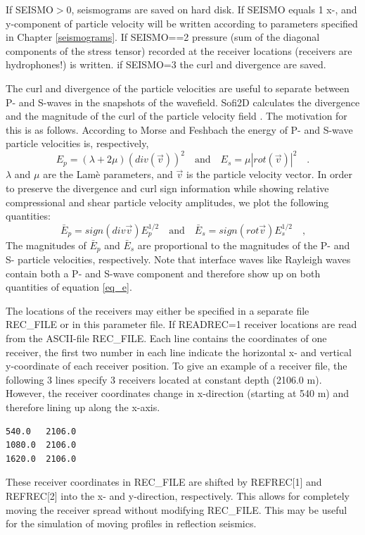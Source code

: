 \documentclass[11pt,onecolumn,oneside]{article}
\begin{document}
If SEISMO$>$0, seismograms are saved on hard disk. If SEISMO equals 1 x-, and y-component of particle velocity will be written according to parameters specified in Chapter \ref{seismograms}.
If SEISMO==2 pressure (sum of the diagonal components of the stress tensor) recorded at the receiver locations (receivers are hydrophones!) is written. if SEISMO=3 the curl and divergence are saved. 

The curl and divergence of the particle velocities are useful to separate between P- and S-waves in the snapshots of the wavefield. Sofi2D calculates the divergence and the magnitude of the curl of the particle velocity field \cite{dougherty:88}. The motivation for this is as follows. According to Morse and Feshbach  the energy of P- and S-wave particle velocities is, respectively,
\begin{equation}
E_p=\left(\lambda + 2 \mu\right) (div(\vec{v}))^2 \quad \mbox{and} \quad E_s=\mu \left|rot(\vec{v})\right|^2 \quad\mbox{.}
\label{eq_E}
\end{equation}
$\lambda$ and $\mu$ are the Lam\`{e} parameters, and $\vec{v}$ is the particle velocity vector. In order to preserve the divergence and curl sign information  while showing relative compressional
and shear particle velocity amplitudes, we plot the following quantities:
\begin{equation}
\bar{E}_p=sign(div \vec{v}) E_p^{1/2} \quad \mbox{and} \quad \bar{E}_s= sign(rot\vec{v}) E_s^{1/2} \quad\mbox{,}
\label{eq_e}
\end{equation}
The magnitudes of $\bar{E}_p$ and $\bar{E}_s$ are proportional to the magnitudes of the P- and S- particle velocities, respectively. Note that interface waves like Rayleigh waves contain both a P- and S-wave component and therefore show up on both quantities of equation \ref{eq_e}.

The locations of the receivers may either be specified in a separate file REC\_FILE or in this parameter file. If READREC=1 receiver locations are read from the ASCII-file REC\_FILE. Each line contains the coordinates of one receiver, the first two number in each line indicate the horizontal x- and vertical y-coordinate of each receiver position. To give an example of a receiver file, the following 3 lines specify 3 receivers located at constant depth (2106.0 m). However, the receiver coordinates change in x-direction (starting at 540 m) and therefore lining up along the x-axis.  
\begin{verbatim}
540.0   2106.0
1080.0  2106.0
1620.0  2106.0
\end{verbatim}
These receiver coordinates in REC\_FILE are shifted by REFREC[1] and REFREC[2] into the  x- and y-direction, respectively. This allows for completely moving the receiver spread without modifying REC\_FILE. This may be useful for the simulation of moving profiles in reflection seismics.
\end{document}
